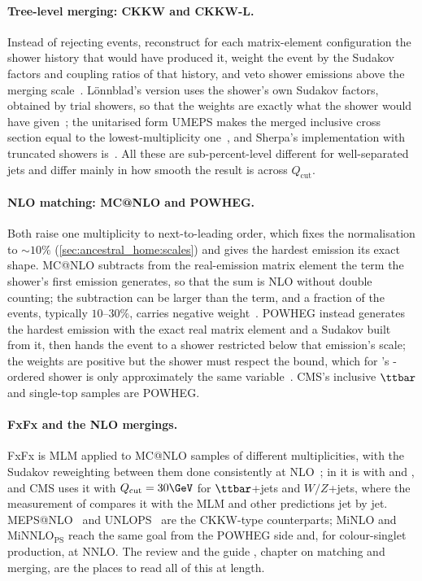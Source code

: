 \paragraph{Tree-level merging: CKKW and CKKW-L.} Instead of rejecting events,
reconstruct for each matrix-element configuration the shower history that
would have produced it, weight the event by the Sudakov factors and
coupling ratios of that history, and veto shower emissions above the
merging scale~\cite{Catani:2001cc}. L\"onnblad's version uses the
shower's own Sudakov factors, obtained by trial showers, so that the
weights are exactly what the shower would have given~\cite{Lonnblad:2001iq,Lonnblad:2011xx};
the unitarised form UMEPS makes the merged inclusive cross section equal
to the lowest-multiplicity one~\cite{Lonnblad:2012ng}, and Sherpa's
implementation with truncated showers is~\cite{Hoeche:2009rj}. All these
are sub-percent-level different for well-separated jets and differ mainly
in how smooth the result is across $Q_{\mathrm{cut}}$.

\paragraph{NLO matching: MC@NLO and POWHEG.} Both raise one multiplicity to
next-to-leading order, which fixes the normalisation to $\sim10\%$
(\cref{sec:ancestral_home:scales}) and gives the hardest emission
its exact shape. MC@NLO subtracts from the real-emission matrix element the
term the shower's first emission generates, so that the sum is NLO without
double counting; the subtraction can be larger than the term, and a fraction
of the events, typically $10$--$30\%$, carries negative
weight~\cite{Frixione:2002ik,Alwall:2014hca}. POWHEG instead generates the
hardest emission with the exact real matrix element and a Sudakov built from
it, then hands the event to a shower restricted below that emission's
scale; the weights are positive but the shower must respect the
 bound, which for \PYTHIA's \pt-ordered shower is only
approximately the same variable~\cite{Nason:2004rx,Frixione:2007vw}. CMS's
inclusive $\ttbar$ and single-top samples are POWHEG.

\paragraph{FxFx and the NLO mergings.} FxFx is MLM applied to MC@NLO
samples of different multiplicities, with the Sudakov reweighting between
them done consistently at NLO~\cite{Frederix:2012ps,Frederix:2015eii}; in
\PYTHIA it is  with 
and , and CMS uses it with $Q_{\mathrm{cut}}=30\GeV$
for $\ttbar$+jets and $W/Z$+jets, where the measurement of
\cite{CMS:2022ilp} compares it with the MLM and other predictions jet by
jet. MEPS@NLO~\cite{Hoeche:2012yf} and UNLOPS~\cite{Lonnblad:2012ix} are the
CKKW-type counterparts; MiNLO and MiNNLO$_{\mathrm{PS}}$
\cite{Hamilton:2012np,Monni:2019whf} reach the same goal from the POWHEG
side and, for colour-singlet production, at NNLO. The review
\cite{Buckley:2011ms} and the \PYTHIA guide \cite{Bierlich:2022pfr},
chapter on matching and merging, are the places to read all of this at
length.

